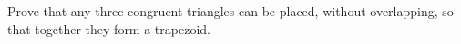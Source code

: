 Prove that any three congruent triangles can be placed, without overlapping, so that together they form a trapezoid.
